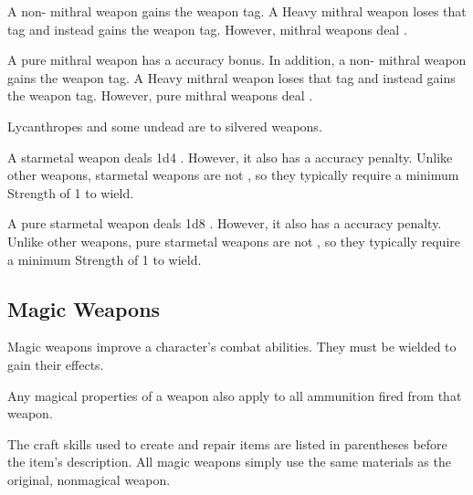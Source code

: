        A non- mithral weapon gains the  weapon tag.
      A Heavy mithral weapon loses that tag and instead gains the  weapon tag.
      However, mithral weapons deal  .

       A pure mithral weapon has a  accuracy bonus.
      In addition, a non- mithral weapon gains the  weapon tag.
      A Heavy mithral weapon loses that tag and instead gains the  weapon tag.
      However, pure mithral weapons deal  .

       Lycanthropes and some undead are  to silvered weapons.

       A starmetal weapon deals \plus1d4 .
      However, it also has a  accuracy penalty.
      Unlike other weapons, starmetal weapons are not , so they typically require a minimum Strength of 1 to wield.

       A pure starmetal weapon deals \plus1d8 .
      However, it also has a  accuracy penalty.
      Unlike other weapons, pure starmetal weapons are not , so they typically require a minimum Strength of 1 to wield.

      \begin{longcolumn}
        \section{Magic Weapons}
          \begin{longtablepreface}

            Magic weapons improve a character's combat abilities.
            They must be wielded to gain their effects.

             Any magical properties of a  weapon also apply to all ammunition fired from that weapon.

             The craft skills used to create and repair items are listed in parentheses before the item's description.
            All magic weapons simply use the same materials as the original, nonmagical weapon.
          \end{longtablepreface}

          

      \end{longcolumn}

